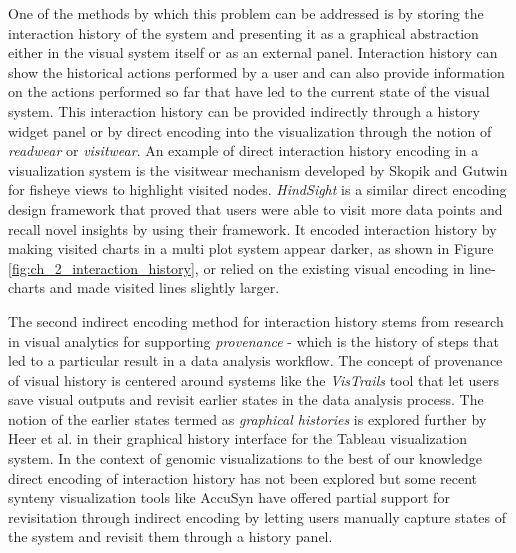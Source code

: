 One of the methods by which this problem can be addressed is by storing the interaction history of the system and presenting it as a graphical abstraction either in the visual system itself or as an external panel. Interaction history can show the historical actions performed by a user and can also provide information on the actions performed so far that have led to the current state of the visual system. This interaction history can be provided indirectly through a history widget panel or by direct encoding into the visualization through the notion of \textit{readwear} or \textit{visitwear}. An example of  direct interaction history encoding in a visualization system is the visitwear mechanism developed by Skopik and Gutwin for fisheye views to highlight visited nodes. \textit{HindSight} is a similar direct encoding design framework that proved that users were able to visit more data points and recall novel insights by using their framework\cite{feng2016hindsight}. It encoded interaction history by making visited charts in a multi plot system appear darker, as shown in Figure \ref{fig:ch_2_interaction_history}, or relied on the existing visual encoding in line-charts and made visited lines slightly larger.

The second indirect encoding method for interaction history stems from research in visual analytics for supporting \textit{provenance} - which is the history of steps that led to a particular result in a data analysis workflow\cite{gotz2009characterizing,freire2008provenance}. The concept of provenance of visual history is centered around systems like the \textit{VisTrails} tool\cite{bavoil2005vistrails} that let users save visual outputs and revisit earlier states in the data analysis process. The notion of the earlier states termed as \textit{graphical histories} is explored further by Heer et al.\cite{heer2008graphical} in their graphical history interface for the Tableau visualization system.
In the context of genomic visualizations to the best of our knowledge direct encoding of interaction  history has not been explored but some recent synteny visualization tools like AccuSyn have offered partial support for revisitation through indirect encoding by letting users manually capture states of the system and revisit them through a history panel.